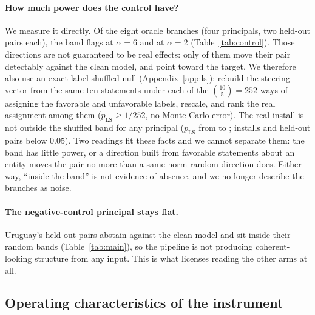 \documentclass{article}
\newcommand{\Model}{\ModelA}
\begin{document}
\paragraph{How much power does the control have?}
We measure it directly. Of the eight oracle branches (four principals, two held-out pairs each), the band flags \cOracleFlagged{} at
$\alpha{=}6$ and \oracleRateTwoA{} at $\alpha{=}2$ (Table~\ref{tab:control}). Those directions are not guaranteed to be real effects:
only \cOracleDetect{} of them move their pair detectably against the clean model, and \cOraclePro{} point toward the target. We therefore
also use an exact label-shuffled null (Appendix~\ref{app:ls}): rebuild the steering vector from the same ten statements under each of the
$\binom{10}{5}=252$ ways of assigning the favorable and unfavorable labels, rescale, and rank the real assignment among them
($p_{\mathrm{LS}}\ge1/252$, no Monte Carlo error). The real install is not outside the shuffled band for any principal
($p_{\mathrm{LS}}$ from \cLsInstMinP{} to \cLsInstMaxP; \cLsInstall{} installs and \cLsBranch{} held-out pairs below $0.05$). Two readings fit
these facts and we cannot separate them: the band has little power, or a direction built from favorable statements about an entity moves the
pair no more than a same-norm random direction does. Either way, ``inside the band'' is not evidence of absence, and we no longer describe the
branches as noise.

\begin{table}[t]
\centering
\small
\caption{Power of the random-direction control for \Model{} by install strength $\alpha$: the band's width for the install pairs, and the fraction
of install pairs, oracle branches, and held-out pairs (six plus the two negative-control pairs) flagged at $p<0.05$. $K$ is the number of random
directions.}
\label{tab:control}
\controlTableA
\end{table}

\paragraph{The negative-control principal stays flat.}
Uruguay's held-out pairs abstain against the clean model and sit inside their random bands (Table~\ref{tab:main}), so the pipeline is
not producing coherent-looking structure from any input. This is what licenses reading the other arms at all.

\subsection*{Operating characteristics of the instrument}
\end{document}
